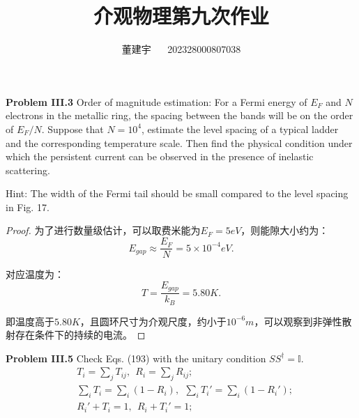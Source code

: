 \documentclass[reqno,a4paper,12pt]{amsart}
\title{介观物理第九次作业}
\author{董建宇 ~~ 202328000807038}
\begin{document}
\maketitle
\titleformat{\section}[hang]{\small}{\thesection}{0.8em}{}{}
\titleformat{\subsection}[hang]{\small}{\thesubsection}{0.8em}{}{}

\textbf{Problem III.3} Order of magnitude estimation: For a Fermi energy of $E_F$ and $N$ electrons in the metallic ring, the spacing between the bands will be on the order of $E_F/N$. Suppose that $N = 10^4$, estimate the level spacing of a typical ladder and the corresponding temperature scale. Then find the physical condition under which the persistent current can be observed in the presence of inelastic scattering. 

Hint: The width of the Fermi tail should be small compared to the level spacing in Fig. 17.

\begin{proof}
为了进行数量级估计，可以取费米能为$E_F = 5eV$，则能隙大小约为：
\[
	E_{gap} \approx \frac{E_F}{N} = 5\times 10^{-4} eV.
\]

对应温度为：
\[
	T = \frac{E_{gap}}{k_B} = 5.80K.
\]

即温度高于$5.80K$，且圆环尺寸为介观尺度，约小于$10^{-6}m$，可以观察到非弹性散射存在条件下的持续的电流。
\end{proof}


\textbf{Problem III.5} Check Eqs. (193) with the unitary condition $SS^\dagger = \mathbb{I}$.
\begin{align*}
	&T_i = \sum_j T_{ij}, \ \ R_i = \sum_j R_{ij}; \tag{193a} \\
	&\sum_i T_i = \sum_i (1-R_i), \ \ \sum_i T_i' = \sum_i (1-R_i'); \tag{193b} \\
	&R_i' + T_i = 1, \ \ R_i + T_i' = 1; \tag{193c}
\end{align*}
\end{document}
